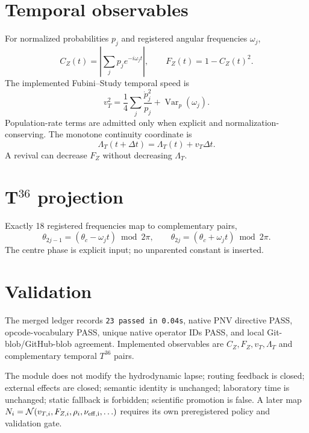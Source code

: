 \section{Temporal observables}
For normalized probabilities \(p_j\) and registered angular frequencies \(\omega_j\),
\[
C_Z(t)=\left|\sum_jp_je^{-i\omega_jt}\right|,
\qquad
\boxed{F_Z(t)=1-C_Z(t)^2}.
\]
The implemented Fubini--Study temporal speed is
\[
\boxed{v_T^2=\frac14\sum_j\frac{\dot p_j^2}{p_j}+\operatorname{Var}_p(\omega_j)}.
\]
Population-rate terms are admitted only when explicit and normalization-conserving. The monotone continuity coordinate is
\[
\Lambda_T(t+\Delta t)=\Lambda_T(t)+v_T\Delta t.
\]
A revival can decrease \(F_Z\) without decreasing \(\Lambda_T\).

\section{T\texorpdfstring{$^{36}$}{36} projection}
Exactly 18 registered frequencies map to complementary pairs,
\[
\theta_{2j-1}=(\theta_c-\omega_jt)\bmod2\pi,
\qquad
\theta_{2j}=(\theta_c+\omega_jt)\bmod2\pi.
\]
The centre phase is explicit input; no unparented constant is inserted.

\section{Validation}
The merged ledger records \texttt{23 passed in 0.04s}, native PNV directive PASS, opcode-vocabulary PASS, unique native operator IDs PASS, and local Git-blob/GitHub-blob agreement. Implemented observables are \(C_Z,F_Z,v_T,\Lambda_T\) and complementary temporal \(T^{36}\) pairs.

\begin{boundarybox}
The module does not modify the hydrodynamic lapse; routing feedback is closed; external effects are closed; semantic identity is unchanged; laboratory time is unchanged; static fallback is forbidden; scientific promotion is false. A later map \(N_i=\mathcal N(v_{T,i},F_{Z,i},\rho_i,\nu_{\rm eff,i},\ldots)\) requires its own preregistered policy and validation gate.
\end{boundarybox}
